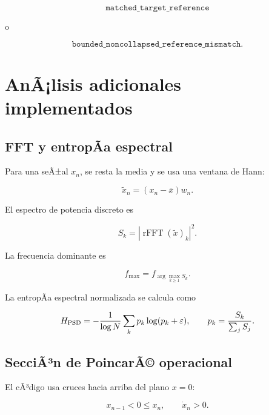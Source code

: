 \documentclass[11pt]{article}
\begin{document}
\begin{equation}
\texttt{matched\_target\_reference}
\end{equation}

o

\begin{equation}
\texttt{bounded\_noncollapsed\_reference\_mismatch}.
\end{equation}

\section{AnÃ¡lisis adicionales implementados}

\subsection{FFT y entropÃ­a espectral}

Para una seÃ±al \(x_n\), se resta la media y se usa una ventana de Hann:

\begin{equation}
\tilde x_n=(x_n-\bar x)w_n.
\end{equation}

El espectro de potencia discreto es

\begin{equation}
S_k=|\operatorname{rFFT}(\tilde x)_k|^2.
\end{equation}

La frecuencia dominante es

\begin{equation}
f_{\max}=f_{\arg\max_{k\geq 1}S_k}.
\end{equation}

La entropÃ­a espectral normalizada se calcula como

\begin{equation}
H_{\rm PSD}
=
-\frac{1}{\log N}
\sum_k p_k\log(p_k+\varepsilon),
\qquad
p_k=\frac{S_k}{\sum_j S_j}.
\end{equation}

\subsection{SecciÃ³n de PoincarÃ© operacional}

El cÃ³digo usa cruces hacia arriba del plano \(x=0\):

\begin{equation}
x_{n-1}<0\leq x_n,
\qquad
\dot x_n>0.
\end{equation}
\end{document}
